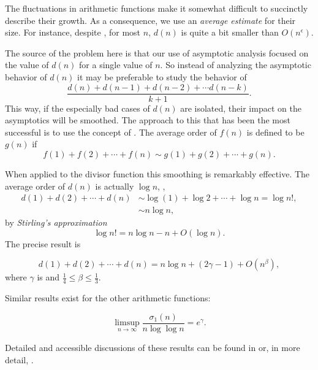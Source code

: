 The fluctuations in arithmetic functions make it somewhat difficult to
succinctly describe their growth.  As a consequence, we use an {\em
average estimate} for their size.  For instance, despite
, for most $n$, $d(n)$ is quite a bit
smaller than $O(n^{\epsilon})$. 

The source of the problem here is that our use of asymptotic analysis
focused on the value of $d(n)$ for a single value of $n$.  So instead
of analyzing the asymptotic behavior of $d(n)$ it may be preferable to
study the behavior of 
\[
\frac{d(n) + d(n-1) + d(n-2) + \cdots d(n-k)}{k+1}.
\]
This way, if the especially bad cases of $d(n)$ are isolated, their
impact on the asymptotics will be smoothed.  The approach to this that
has been the most successful is to use the concept of .  The average order of $f(n)$ is defined to be $g(n)$ if
\[
f(1)+ f(2) +\cdots + f(n) \sim g(1)+ g(2) + \cdots + g(n).
\]

When applied to the divisor function this smoothing is remarkably
effective.  The average order of $d(n)$ is actually $\log n$, \ie,
\[
\begin{aligned}
  d(1) + d(2) +\cdots + d(n) 
   &\sim \log(1) + \log 2 +\cdots + \log n = \log n!,\\
   & \sim n \log n,
\end{aligned}
\]
by {\em Stirling's approximation}
\begin{equation} \label{Stirling:Eqc}
\log n! = n \log n - n + O(\log n).
\end{equation}
The precise result is 

\begin{proposition}
\[
d(1) + d(2) +\cdots + d(n) = n\log n + (2\gamma -1) + O(n^{\beta}),
\]
where $\gamma$ is  and $\frac{1}{4} \le \beta \le
\frac{1}{3}$.
\end{proposition}

\medskip
Similar results exist for the other arithmetic functions: 

\begin{proposition}
\[
\mathop{\limsup}\limits_{n\rightarrow\infty} \frac{\sigma_1(n)}{n \log \log n}
   = e^{\gamma}.
\]
\end{proposition}

Detailed and accessible discussions of these results can be found in
\cite{Hardy2008-bt} or, in more detail, \cite{Landau1974-cy}.

